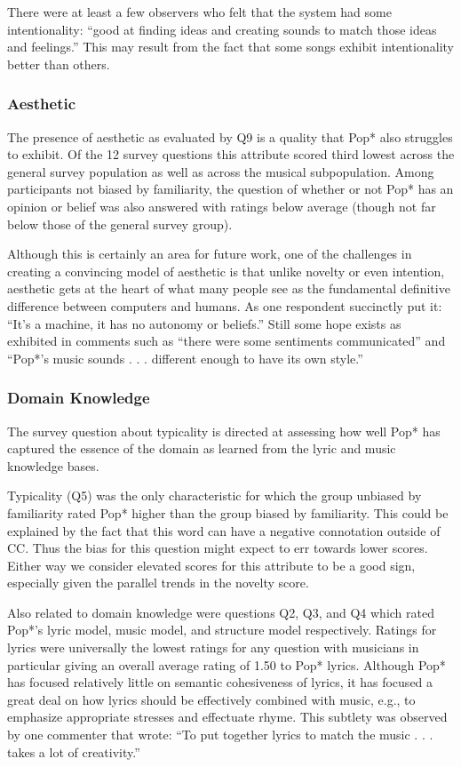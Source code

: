 \documentclass[phd,electronic,oneside,twosidetoc,letterpaper,chaptercenter,parttop,lof,lot]{byumsphd}
\begin{document}
There were at least a few observers who felt that the system had some intentionality: ``good at finding ideas and creating sounds to match those ideas and feelings.'' This may result from the fact that some songs exhibit intentionality better than others.

\subsubsection{Aesthetic}

The presence of aesthetic as evaluated by Q9 is a quality that Pop* also struggles to exhibit. Of the 12 survey questions this attribute scored third lowest across the general survey population as well as across the musical subpopulation. Among participants not biased by familiarity, the question of whether or not Pop* has an opinion or belief was also answered with ratings below average (though not far below those of the general survey group).

Although this is certainly an area for future work, one of the challenges in creating a convincing model of aesthetic is that unlike novelty or even intention, aesthetic gets at the heart of what many people see as the fundamental definitive difference between computers and humans. As one respondent succinctly put it: ``It's a machine, it has no autonomy or beliefs.'' Still some hope exists as exhibited in comments such as ``there were some sentiments communicated'' and ``Pop*'s music sounds . . . different enough to have its own style.''

\subsubsection{Domain Knowledge}

The survey question about typicality is directed at assessing how well Pop* has captured the essence of the domain as learned from the lyric and music knowledge bases.

Typicality (Q5) was the only characteristic for which the group unbiased by familiarity rated Pop* higher than the group biased by familiarity. This could be explained by the fact that this word can have a negative connotation outside of CC. Thus the bias for this question might expect to err towards lower scores. Either way we consider elevated scores for this attribute to be a good sign, especially given the parallel trends in the novelty score.

Also related to domain knowledge were questions Q2, Q3, and Q4 which rated Pop*'s lyric model, music model, and structure model respectively. Ratings for lyrics were universally the lowest ratings for any question with musicians in particular giving an overall average rating of 1.50 to Pop* lyrics. Although Pop* has focused relatively little on semantic cohesiveness of lyrics, it has focused a great deal on how lyrics should be effectively combined with music, e.g., to emphasize appropriate stresses and effectuate rhyme. This subtlety was observed by one commenter that wrote: ``To put together lyrics to match the music . . . takes a lot of creativity.''
\end{document}
